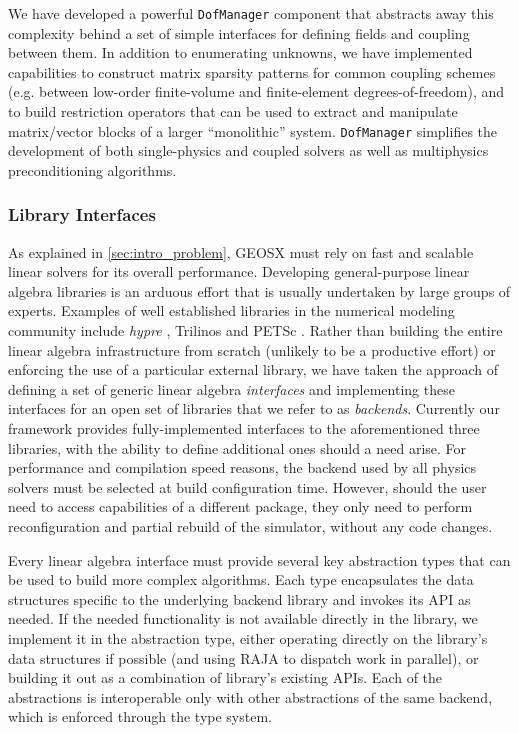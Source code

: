 We have developed a powerful \texttt{DofManager} component that abstracts away this complexity behind a set of simple interfaces for defining fields and coupling between them.   In addition to enumerating unknowns, we have implemented capabilities to construct matrix sparsity patterns for common coupling schemes (e.g. between low-order finite-volume and finite-element degrees-of-freedom), and to build restriction operators that can be used to extract and manipulate matrix/vector blocks of a larger ``monolithic'' system.   \texttt{DofManager} simplifies the development of both single-physics and coupled solvers as well as multiphysics preconditioning algorithms.

\subsubsection{Library Interfaces}

As explained in \cref{sec:intro_problem}, GEOSX must rely on fast and scalable linear solvers for its overall performance.   Developing general-purpose linear algebra libraries is an arduous effort that is usually undertaken by large groups of experts.   Examples of well established libraries in the numerical modeling community include \textit{hypre} \cite{hypre}, Trilinos \cite{trilinos-website} and PETSc \cite{petsc-user-ref}.   Rather than building the entire linear algebra infrastructure from scratch (unlikely to be a productive effort) or enforcing the use of a particular external library, we have taken the approach of defining a set of generic linear algebra \textit{interfaces} and implementing these interfaces for an open set of libraries that we refer to as \textit{backends}.   Currently our framework provides fully-implemented interfaces to the aforementioned three libraries, with the ability to define additional ones should a need arise.   For performance and compilation speed reasons, the backend used by all physics solvers must be selected at build configuration time.   However, should the user need to access capabilities of a different package, they only need to perform reconfiguration and partial rebuild of the simulator, without any code changes.

Every linear algebra interface must provide several key abstraction types that can be used to build more complex algorithms.   Each type encapsulates the data structures specific to the underlying backend library and invokes its API as needed.   If the needed functionality is not available directly in the library, we implement it in the abstraction type, either operating directly on the library's data structures if possible (and using RAJA to dispatch work in parallel), or building it out as a combination of library's existing APIs.   Each of the abstractions is interoperable only with other abstractions of the same backend, which is enforced through the type system.

